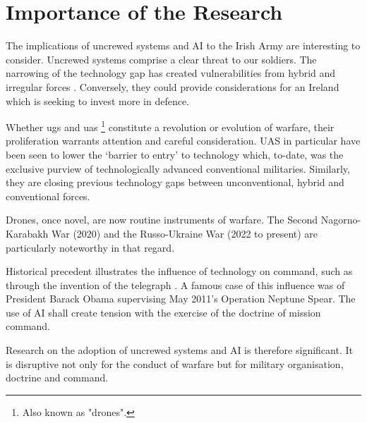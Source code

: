 \chapter{Importance of the Research}

The implications of uncrewed systems and AI to the Irish Army are interesting to consider. Uncrewed systems comprise a clear threat to our soldiers. The narrowing of the technology gap has created vulnerabilities  from hybrid and irregular forces \parencite{HUSAIN_2021}. Conversely, they could provide considerations for an Ireland which is seeking to invest more in defence. 



Whether \gls{ugs} and \gls{uas} \footnote{Also known as "drones".} constitute a revolution or evolution of warfare, their proliferation warrants attention and careful consideration. UAS in particular have been seen to lower the `barrier to entry' to technology which, to-date, was the exclusive purview of technologically advanced conventional militaries. Similarly, they are closing previous technology gaps between unconventional, hybrid and conventional forces.

Drones, once novel, are now routine instruments of warfare. The Second Nagorno-Karabakh War (2020) and the Russo-Ukraine War (2022 to present) are particularly noteworthy in that regard. 



Historical precedent illustrates the influence of technology on command, such as through the invention of the telegraph \parencite{COHEN_1996}. A famous case of this influence was of President Barack Obama supervising May 2011's Operation Neptune Spear. The use of AI shall create tension with the exercise of the doctrine of mission command.

Research on the adoption of uncrewed systems and AI is therefore significant. It is disruptive not only for the conduct of warfare but for military organisation, doctrine and command.  
